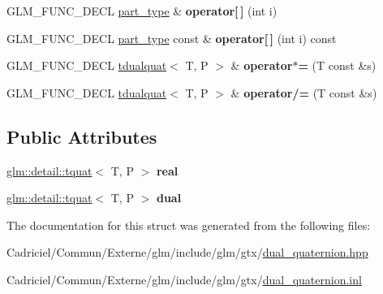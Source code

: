 \begin{DoxyCompactItemize}
\item 
G\+L\+M\+\_\+\+F\+U\+N\+C\+\_\+\+D\+E\+CL \hyperlink{structglm_1_1detail_1_1tquat}{part\+\_\+type} \& {\bfseries operator\mbox{[}$\,$\mbox{]}} (int i)\hypertarget{structglm_1_1detail_1_1tdualquat_a6c97baca66efdfefa2e127d4868ce22c}{}\label{structglm_1_1detail_1_1tdualquat_a6c97baca66efdfefa2e127d4868ce22c}

\item 
G\+L\+M\+\_\+\+F\+U\+N\+C\+\_\+\+D\+E\+CL \hyperlink{structglm_1_1detail_1_1tquat}{part\+\_\+type} const \& {\bfseries operator\mbox{[}$\,$\mbox{]}} (int i) const \hypertarget{structglm_1_1detail_1_1tdualquat_a7a646a4f41587c5a8ba9ebb728b64b24}{}\label{structglm_1_1detail_1_1tdualquat_a7a646a4f41587c5a8ba9ebb728b64b24}

\item 
G\+L\+M\+\_\+\+F\+U\+N\+C\+\_\+\+D\+E\+CL \hyperlink{structglm_1_1detail_1_1tdualquat}{tdualquat}$<$ T, P $>$ \& {\bfseries operator$\ast$=} (T const \&s)\hypertarget{structglm_1_1detail_1_1tdualquat_ab958553d52f05997218dc32ff66308ff}{}\label{structglm_1_1detail_1_1tdualquat_ab958553d52f05997218dc32ff66308ff}

\item 
G\+L\+M\+\_\+\+F\+U\+N\+C\+\_\+\+D\+E\+CL \hyperlink{structglm_1_1detail_1_1tdualquat}{tdualquat}$<$ T, P $>$ \& {\bfseries operator/=} (T const \&s)\hypertarget{structglm_1_1detail_1_1tdualquat_a16b0b3f78c28d7cf982761d66dada98d}{}\label{structglm_1_1detail_1_1tdualquat_a16b0b3f78c28d7cf982761d66dada98d}

\end{DoxyCompactItemize}
\subsection*{Public Attributes}
\begin{DoxyCompactItemize}
\item 
\hyperlink{structglm_1_1detail_1_1tquat}{glm\+::detail\+::tquat}$<$ T, P $>$ {\bfseries real}\hypertarget{structglm_1_1detail_1_1tdualquat_abebb177d1dca2b170fe7d01e9970eb37}{}\label{structglm_1_1detail_1_1tdualquat_abebb177d1dca2b170fe7d01e9970eb37}

\item 
\hyperlink{structglm_1_1detail_1_1tquat}{glm\+::detail\+::tquat}$<$ T, P $>$ {\bfseries dual}\hypertarget{structglm_1_1detail_1_1tdualquat_a6d739e4771a6244cc15562c2ecda7fdc}{}\label{structglm_1_1detail_1_1tdualquat_a6d739e4771a6244cc15562c2ecda7fdc}

\end{DoxyCompactItemize}


The documentation for this struct was generated from the following files\+:\begin{DoxyCompactItemize}
\item 
Cadriciel/\+Commun/\+Externe/glm/include/glm/gtx/\hyperlink{dual__quaternion_8hpp}{dual\+\_\+quaternion.\+hpp}\item 
Cadriciel/\+Commun/\+Externe/glm/include/glm/gtx/\hyperlink{dual__quaternion_8inl}{dual\+\_\+quaternion.\+inl}\end{DoxyCompactItemize}
